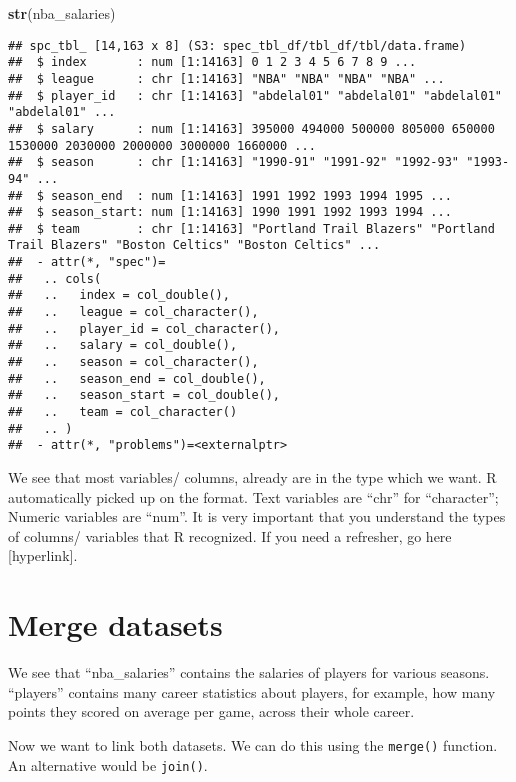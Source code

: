 \documentclass[
]{book}
\newenvironment{Shaded}{\begin{snugshade}}{\end{snugshade}}
\newcommand{\FunctionTok}[1]{\textcolor[rgb]{0.13,0.29,0.53}{\textbf{#1}}}
\newcommand{\NormalTok}[1]{#1}
\begin{document}
\begin{Shaded}
\begin{Highlighting}[]
\FunctionTok{str}\NormalTok{(nba\_salaries)}
\end{Highlighting}
\end{Shaded}

\begin{verbatim}
## spc_tbl_ [14,163 x 8] (S3: spec_tbl_df/tbl_df/tbl/data.frame)
##  $ index       : num [1:14163] 0 1 2 3 4 5 6 7 8 9 ...
##  $ league      : chr [1:14163] "NBA" "NBA" "NBA" "NBA" ...
##  $ player_id   : chr [1:14163] "abdelal01" "abdelal01" "abdelal01" "abdelal01" ...
##  $ salary      : num [1:14163] 395000 494000 500000 805000 650000 1530000 2030000 2000000 3000000 1660000 ...
##  $ season      : chr [1:14163] "1990-91" "1991-92" "1992-93" "1993-94" ...
##  $ season_end  : num [1:14163] 1991 1992 1993 1994 1995 ...
##  $ season_start: num [1:14163] 1990 1991 1992 1993 1994 ...
##  $ team        : chr [1:14163] "Portland Trail Blazers" "Portland Trail Blazers" "Boston Celtics" "Boston Celtics" ...
##  - attr(*, "spec")=
##   .. cols(
##   ..   index = col_double(),
##   ..   league = col_character(),
##   ..   player_id = col_character(),
##   ..   salary = col_double(),
##   ..   season = col_character(),
##   ..   season_end = col_double(),
##   ..   season_start = col_double(),
##   ..   team = col_character()
##   .. )
##  - attr(*, "problems")=<externalptr>
\end{verbatim}

We see that most variables/ columns, already are in the type which we want. R automatically picked up on the format. Text variables are ``chr'' for ``character''; Numeric variables are ``num''. It is very important that you understand the types of columns/ variables that R recognized. If you need a refresher, go here {[}hyperlink{]}.

\hypertarget{merge-datasets}{%
\section{Merge datasets}\label{merge-datasets}}

We see that ``nba\_salaries'' contains the salaries of players for various seasons.
``players'' contains many career statistics about players, for example, how many points they scored on average per game, across their whole career.

Now we want to link both datasets. We can do this using the \texttt{merge()} function.
An alternative would be \texttt{join()}.
\end{document}
